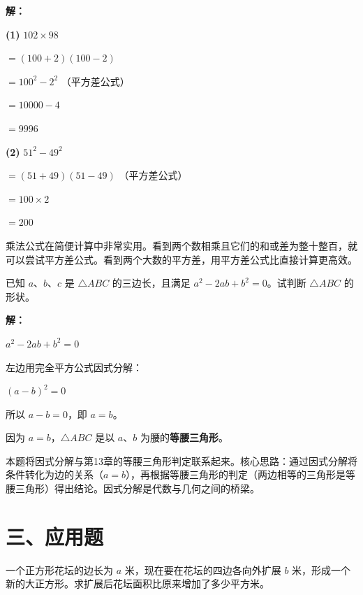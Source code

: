 \documentclass[12pt, a4paper]{ctexart}
\begin{document}
\textbf{解：}

\textbf{(1)} $102 \times 98$

$= (100 + 2)(100 - 2)$

$= 100^2 - 2^2$ \quad（平方差公式）

$= 10000 - 4$

$= 9996$

\medskip
\textbf{(2)} $51^2 - 49^2$

$= (51 + 49)(51 - 49)$ \quad（平方差公式）

$= 100 \times 2$

$= 200$

\begin{tipbox}[方法总结]
乘法公式在简便计算中非常实用。看到两个数相乘且它们的和或差为整十整百，就可以尝试平方差公式。看到两个大数的平方差，用平方差公式比直接计算更高效。
\end{tipbox}

\begin{examplebox}
已知 $a$、$b$、$c$ 是 $\triangle ABC$ 的三边长，且满足 $a^2 - 2ab + b^2 = 0$。试判断 $\triangle ABC$ 的形状。
\end{examplebox}

\textbf{解：}

$a^2 - 2ab + b^2 = 0$

左边用完全平方公式因式分解：

$(a - b)^2 = 0$

所以 $a - b = 0$，即 $a = b$。

因为 $a = b$，$\triangle ABC$ 是以 $a$、$b$ 为腰的\textbf{等腰三角形}。

\begin{tipbox}[方法总结]
本题将因式分解与第13章的等腰三角形判定联系起来。核心思路：通过因式分解将条件转化为边的关系（$a = b$），再根据等腰三角形的判定（两边相等的三角形是等腰三角形）得出结论。因式分解是代数与几何之间的桥梁。
\end{tipbox}

\section*{\textcolor{apppurple}{三、应用题}}

\begin{appbox}
一个正方形花坛的边长为 $a$ 米，现在要在花坛的四边各向外扩展 $b$ 米，形成一个新的大正方形。求扩展后花坛面积比原来增加了多少平方米。
\end{appbox}
\end{document}
